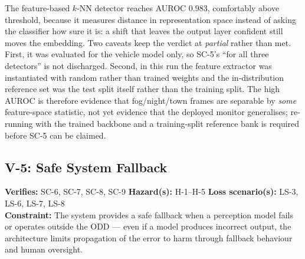 \documentclass[a4paper,12pt]{article}
\begin{document}
The feature-based $k$-NN detector reaches AUROC $0.983$, comfortably above threshold,
because it measures distance in representation space instead of asking the classifier how
sure it is: a shift that leaves the output layer confident still moves the embedding. Two
caveats keep the verdict at \emph{partial} rather than met. First, it was evaluated for the
vehicle model only, so SC-5's ``for all three detectors'' is not discharged. Second, in this
run the feature extractor was instantiated with random rather than trained weights and the
in-distribution reference set was the test split itself rather than the training split. The
high AUROC is therefore evidence that fog/night/town frames are separable by \emph{some}
feature-space statistic, not yet evidence that the deployed monitor generalises; re-running
with the trained backbone and a training-split reference bank is required before SC-5 can
be claimed.


\subsection{V-5: Safe System Fallback}

\begin{mdframed}[style=subclaim]
\textbf{Verifies:} SC-6, SC-7, SC-8, SC-9 \quad \textbf{Hazard(s):} H-1--H-5 \quad
\textbf{Loss scenario(s):} LS-3, LS-6, LS-7, LS-8\\
\textbf{Constraint:} The system provides a safe fallback when a perception model fails or
operates outside the ODD --- even if a model produces incorrect output, the architecture
limits propagation of the error to harm through fallback behaviour and human oversight.
\end{mdframed}
\end{document}
